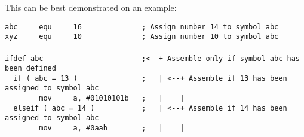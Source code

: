 {        This can be best demonstrated on an example:
                \begin{code}[h!]
                        \mysmallfont{}
                        {\color{highlight_constant}\verb'abc'}\verb'     '{\color{highlight_directive}\verb'equ'}\verb'     '{\color{highlight_unknown_base}\verb'16'}\verb'              '{\color{highlight_comment}\verb'; Assign number 14 to symbol abc'}\\
                        {\color{highlight_constant}\verb'xyz'}\verb'     '{\color{highlight_directive}\verb'equ'}\verb'     '{\color{highlight_unknown_base}\verb'10'}\verb'              '{\color{highlight_comment}\verb'; Assign number 10 to symbol abc'}\\
                        \verb''\\
                        {\color{highlight_directive}\verb'ifdef'}\verb' '{\color{highlight_constant}\verb'abc'}\verb'                       '{\color{highlight_comment}\verb';<--+ Assemble only if symbol abc has been defined'}\\
                        \verb'  '{\color{highlight_directive}\verb'if'}\verb' '{\color{highlight_symbol}\verb'('}\verb' '{\color{highlight_constant}\verb'abc'}\verb' '{\color{highlight_symbol}\verb'='}\verb' '{\color{highlight_unknown_base}\verb'13'}\verb' '{\color{highlight_symbol}\verb')'}\verb'               '{\color{highlight_comment}\verb';   | <--+ Assemble if 13 has been assigned to symbol abc'}\\
                        \verb'        '{\color{highlight_instruction}\verb'mov'}\verb'     '{\color{highlight_sfr}\verb'a'}{\color{highlight_oper_sep}\verb','}\verb' '{\color{highlight_imm_bin}\verb'#01010101b'}\verb'   '{\color{highlight_comment}\verb';   |    |'}\\
                        \verb'  '{\color{highlight_directive}\verb'elseif'}\verb' '{\color{highlight_symbol}\verb'('}\verb' '{\color{highlight_constant}\verb'abc'}\verb' '{\color{highlight_symbol}\verb'='}\verb' '{\color{highlight_unknown_base}\verb'14'}\verb' '{\color{highlight_symbol}\verb')'}\verb'           '{\color{highlight_comment}\verb';   | <--+ Assemble if 14 has been assigned to symbol abc'}\\
                        \verb'        '{\color{highlight_instruction}\verb'mov'}\verb'     '{\color{highlight_sfr}\verb'a'}{\color{highlight_oper_sep}\verb','}\verb' '{\color{highlight_imm_hex}\verb'#0aah'}\verb'        '{\color{highlight_comment}\verb';   |    |'}\\

\end{code}}
